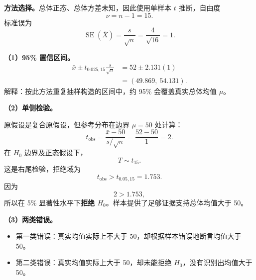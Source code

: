 \documentclass[11pt,a4paper]{article}
\newcommand{\SE}{\operatorname{SE}}
\begin{document}
\begin{solutionbox}
\textbf{方法选择。}总体正态、总体方差未知，因此使用单样本 $t$ 推断，自由度
\[
  \nu=n-1=15.
\]
标准误为
\[
  \SE(\bar X)=\frac{s}{\sqrt n}
  =
  \frac4{\sqrt{16}}
  =
  1.
\]

\textbf{（1）95\% 置信区间。}
\[
\begin{aligned}
  \bar x
  \pm
  t_{0.025,15}\frac{s}{\sqrt n}
  &=
  52
  \pm
  2.131(1)\\
  &=
  \boxed{(49.869,\ 54.131)}.
\end{aligned}
\]
解释：按此方法重复抽样构造的区间中，约 95\% 会覆盖真实总体均值 $\mu$。

\textbf{（2）单侧检验。}

原假设是复合原假设，但参考分布在边界 $\mu=50$ 处计算：
\[
  t_{\mathrm{obs}}
  =
  \frac{\bar x-50}{s/\sqrt n}
  =
  \frac{52-50}{1}
  =
  2.
\]
在 $H_0$ 边界及正态假设下，
\[
  T\sim t_{15}.
\]
这是右尾检验，拒绝域为
\[
  t_{\mathrm{obs}}>t_{0.05,15}=1.753.
\]
因为
\[
  2>1.753,
\]
所以在 5\% 显著性水平下\textbf{拒绝 $H_0$}。样本提供了足够证据支持总体均值大于 50。

\textbf{（3）两类错误。}
\begin{itemize}
  \item 第一类错误：真实均值实际上不大于 50，却根据样本错误地断言均值大于 50。
  \item 第二类错误：真实均值实际上大于 50，却未能拒绝 $H_0$，没有识别出均值大于 50。
\end{itemize}
\end{solutionbox}
\end{document}
